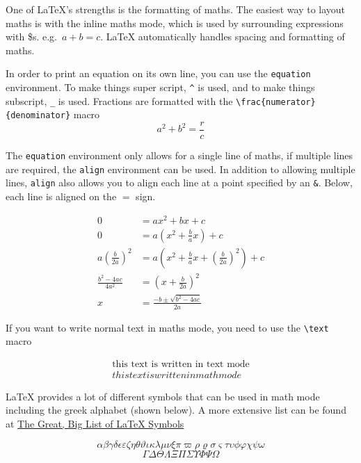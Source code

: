\documentclass{article}
\begin{document}
One of \LaTeX{}'s strengths is the formatting of maths. The easiest way to layout maths is with the inline maths mode, which is used by surrounding expressions with \$s. e.g.\ $a + b = c$. \LaTeX{} automatically handles spacing and formatting of maths.

In order to print an equation on its own line, you can use the \lstinline{equation} environment. To make things super script, \lstinline{^} is used, and to make things subscript, \lstinline{_} is used. Fractions are formatted with the \lstinline|\frac{numerator}{denominator}| macro
\begin{equation}
    a^2 + b^2  = \frac{r}{c}
\end{equation}

The \lstinline{equation} environment only allows for a single line of maths, if multiple lines are required, the \lstinline{align} environment can be used. In addition to allowing multiple lines, \lstinline{align} also allows you to align each line at a point specified by an \lstinline{&}. Below, each line is aligned on the $=$ sign.

\begin{align}
  0 &= ax^2 + bx + c \\
  0 &= a(x^2 + \frac{b}{a}x) + c \\
  a(\frac{b}{2a})^2 &= a(x^2 + \frac{b}{a}x + (\frac{b}{2a})^2) + c \\
  \frac{b^2-4ac}{4a^2} &= (x +\frac{b}{2a})^2 \\
  x &= \frac{-b \pm \sqrt{b^2 - 4ac}}{2a}
\end{align}

If you want to write normal text in maths mode, you need to use the \lstinline{\text} macro

\begin{align}
  \text{this text is written in text mode} \\
  this text is written in math mode
\end{align}

\LaTeX{} provides a lot of different  symbols that can be  used in math mode including the greek alphabet (shown below). A more extensive list can be found at \href{https://www.rpi.edu/dept/arc/training/latex/LaTeX_symbols.pdf}{The Great, Big List of \LaTeX{} Symbols} \cite{carlisle_great_2001}

\begin{equation}
    \alpha \beta \gamma \delta \epsilon \varepsilon \zeta \eta \theta \vartheta \iota \kappa \lambda \mu \nu \xi \pi \varpi \rho \varrho \sigma \varsigma \tau \upsilon \phi \varphi \chi \psi \omega
\end{equation}
\begin{equation}
    \Gamma \Delta \Theta \Lambda \Xi \Pi \Sigma \Upsilon \Phi \Psi \Omega
\end{equation}
\end{document}
